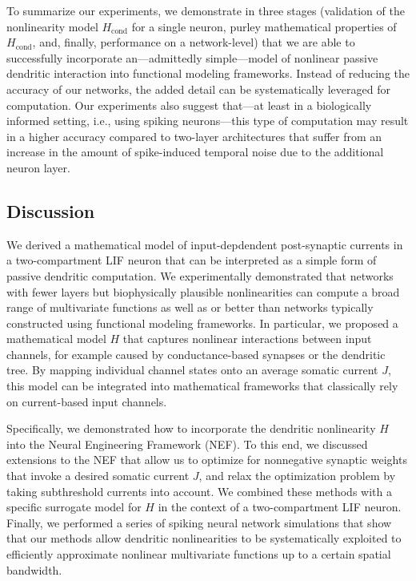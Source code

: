 To summarize our experiments, we demonstrate in three stages (validation of the nonlinearity model $H_\mathrm{cond}$ for a single neuron, purley mathematical properties of $H_\mathrm{cond}$, and, finally, performance on a network-level) that we are able to successfully incorporate an---admittedly simple---model of nonlinear passive dendritic interaction into functional modeling frameworks. Instead of reducing the accuracy of our networks, the added detail can be systematically leveraged for computation. Our experiments also suggest that---at least in a biologically informed setting, i.e., using spiking neurons---this type of computation may result in a higher accuracy compared to two-layer architectures that suffer from an increase in the amount of spike-induced temporal noise due to the additional neuron layer.

\subsection{Discussion}
\label{sec:two_comp_lif_conclusion}

We derived a mathematical model of input-depdendent post-synaptic currents in a two-compartment LIF neuron that can be interpreted as a simple form of passive dendritic computation. We experimentally demonstrated that networks with fewer layers but biophysically plausible nonlinearities can compute a broad range of multivariate functions as well as or better than networks typically constructed using functional modeling frameworks. In particular, we proposed a mathematical model $H$ that captures nonlinear interactions between input channels, for example caused by conductance-based synapses or the dendritic tree. By mapping individual channel states onto an average somatic current $J$, this model can be integrated into mathematical frameworks that classically rely on current-based input channels.

Specifically, we demonstrated how to incorporate the dendritic nonlinearity $H$ into the Neural Engineering Framework (NEF). To this end, we discussed extensions to the NEF that allow us to optimize for nonnegative synaptic weights that invoke a desired somatic current $J$, and relax the optimization problem by taking subthreshold currents into account. We combined these methods with a specific surrogate model for $H$ in the context of a two-compartment LIF neuron. Finally, we performed a series of spiking neural network simulations that show that our methods allow dendritic nonlinearities to be systematically exploited to efficiently approximate nonlinear multivariate functions up to a certain spatial bandwidth.


